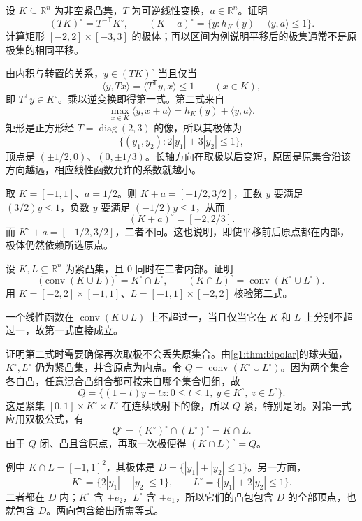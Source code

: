 \begin{exercise}
	\label{g1:exr:polar-transformation}
	设 \(K\subseteq\mathbb R^n\) 为非空紧凸集，\(T\) 为可逆线性变换，\(a\in\mathbb R^n\)。证明
	\[
		(TK)^\circ=T^{-\mathsf T}K^\circ,\qquad (K+a)^\circ=\{y:h_K(y)+\langle y,a\rangle\le1\}.
	\]
	计算矩形 \([-2,2]\times[-3,3]\) 的极体；再以区间为例说明平移后的极集通常不是原极集的相同平移。
\end{exercise}

\begin{solution}
	由内积与转置的关系，\(y\in(TK)^\circ\) 当且仅当
	\[
		\langle y,Tx\rangle=\langle T^{\mathsf T}y,x\rangle\le1\qquad(x\in K),
	\]
	即 \(T^{\mathsf T}y\in K^\circ\)。乘以逆变换即得第一式。第二式来自
	\[
		\max_{x\in K}\langle y,x+a\rangle=h_K(y)+\langle y,a\rangle.
	\]
	矩形是正方形经 \(T=\operatorname{diag}(2,3)\) 的像，所以其极体为
	\[
		\{(y_1,y_2):2|y_1|+3|y_2|\le1\},
	\]
	顶点是 \((\pm1/2,0)\)、\((0,\pm1/3)\)。长轴方向在取极以后变短，原因是原集合沿该方向越远，相应线性函数允许的系数就越小。

	取 \(K=[-1,1]\)、\(a=1/2\)。则 \(K+a=[-1/2,3/2]\)，正数 \(y\) 要满足 \((3/2)y\le1\)，负数 \(y\) 要满足 \((-1/2)y\le1\)，从而
	\[
		(K+a)^\circ=[-2,2/3].
	\]
	而 \(K^\circ+a=[-1/2,3/2]\)，二者不同。这也说明，即使平移前后原点都在内部，极体仍然依赖所选原点。
\end{solution}

\begin{exercise}
	\label{g1:exr:polar-intersection-hull}
	设 \(K,L\subseteq\mathbb R^n\) 为紧凸集，且 \(0\) 同时在二者内部。证明
	\[
		\bigl(\operatorname{conv}(K\cup L)\bigr)^\circ=K^\circ\cap L^\circ,\qquad (K\cap L)^\circ=\operatorname{conv}(K^\circ\cup L^\circ).
	\]
	用 \(K=[-2,2]\times[-1,1]\)、\(L=[-1,1]\times[-2,2]\) 核验第二式。
\end{exercise}

\begin{solution}
	一个线性函数在 \(\operatorname{conv}(K\cup L)\) 上不超过一，当且仅当它在 \(K\) 和 \(L\) 上分别不超过一，故第一式直接成立。

	证明第二式时需要确保再次取极不会丢失原集合。由\cref{g1:thm:bipolar}的球夹逼，\(K^\circ,L^\circ\) 仍为紧凸集，并含原点为内点。令 \(Q=\operatorname{conv}(K^\circ\cup L^\circ)\)。因为两个集合各自凸，任意混合凸组合都可按来自哪个集合归组，故
	\[
		Q=\{(1-t)y+tz:0\le t\le1,\ y\in K^\circ,\ z\in L^\circ\}.
	\]
	这是紧集 \([0,1]\times K^\circ\times L^\circ\) 在连续映射下的像，所以 \(Q\) 紧，特别是闭。对第一式应用双极公式，有
	\[
		Q^\circ=(K^\circ)^\circ\cap(L^\circ)^\circ=K\cap L.
	\]
	由于 \(Q\) 闭、凸且含原点，再取一次极便得 \((K\cap L)^\circ=Q\)。

	例中 \(K\cap L=[-1,1]^2\)，其极体是 \(D=\{|y_1|+|y_2|\le1\}\)。另一方面，
	\[
		K^\circ=\{2|y_1|+|y_2|\le1\},\qquad L^\circ=\{|y_1|+2|y_2|\le1\}.
	\]
	二者都在 \(D\) 内；\(K^\circ\) 含 \(\pm e_2\)，\(L^\circ\) 含 \(\pm e_1\)，所以它们的凸包包含 \(D\) 的全部顶点，也就包含 \(D\)。两向包含给出所需等式。
\end{solution}


